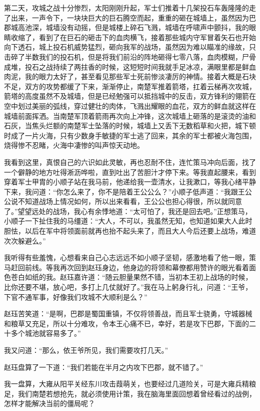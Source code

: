 第二天，攻城之战十分惨烈，太阳刚刚升起，军士们推着十几架投石车轰隆隆的走了出来，一声令下，一块块巨大的巨石腾空而起，重重的砸在城墙上，虽然因为巴郡城高池深，城墙没有动摇，但是城楼上碎石飞溅，城墙在呼啸声中颤抖，我的眼睛收缩了，看到了在巨石的砸击下的血肉横飞，接着那些城内守军冒着矢石也开始向下透石，城上投石机威势猛烈，砸向我军的战场，虽然因为难以瞄准的缘故，只击碎了半数我们的投石机，但是将我们前沿的阵地砸得七零八落，血肉模糊，尸骨成堆，投石之战持续了两拄香的时候，这短短时间我就手足冰凉，满眼里都是鲜血肉泥，我的眼力太好了，甚至看见那些军士死前惨淡凄厉的神情。接着大概是石块不足，双方的攻势都缓了下来，渐渐停止，南楚军推着箭塔，扛着云梯再次攻城，箭塔的高度虽然不及城墙，但是已经勉强可以抵挡城中的反击，双方锋利的翎箭在空中划过美丽的弧线，穿过健壮的肉体，飞溅出耀眼的血花，双方的鲜血就这样在城墙前面挥洒。当南楚军顶着箭雨再次向上冲锋，这次城墙上砸落的是滚烫的油和石灰，当焦头烂额的南楚军士坠落的时候，城墙上又丢下无数稻草和火把，城下顿时成了一片火海，只有少数身手敏捷的军士逃了回来，其余的军士都被火海包围，烧得惨不忍睹，火海中凄惨的叫声惊天动地。

我看到这里，真恨自己的六识如此灵敏，再也忍耐不住，连忙策马冲向后面，找了一个僻静的地方吐得淅沥哗啦，直到吐出了苦胆汁才停下来。等我直起腰来，看到穿着军士甲胄的小顺子站在我马前，他递给我一壶清水，让我漱口，等我心绪平静下来，我问道：“你怎么来了，你不是陪着王公公么？”小顺子低声道：“我跟王公公说不知道战场上情况如何，所以出来看看，王公公也担心得很，所以就同意了。”望望远处的战场，我心有余悸地道：“太可怕了，我还是回去吧。”正想策马，小顺子一下扯住我的马缰道：“大人，不可以，我虽然无知，也知道如果大人此时胆怯，以后在军中将领面前就再也抬不起头来了，而且大人今后还要上战场，难道次次躲避么。”

我听得有些羞愧，心想看来自己心志远远不如小顺子坚韧，感激地看了他一眼，策马赶回前线。等我再次回到赵珏身边，他身边的将领和幕僚都用赞许的眼光看着面色苍白如纸的我。赵珏嘉许道：“随云胆量果然不错，当初本王初上战场的时候，比你还要不堪，放心吧，多打上几仗就好了。”我在马上躬身行礼，问道：“王爷，下官不通军事，好像我们攻城不大顺利是么？”

赵珏苦笑道：“是啊，巴郡是蜀国重镇，不仅将领善战，而且军士骁勇，守城器械和粮草又充足，所以十分难攻，令本王心痛不已，幸好，若是攻下巴郡，下面的二十多个城池就容易多了。”

我又问道：“那么，依王爷所见，我们需要攻打几天。”

赵珏盘算了一下道：“我们若能在半月之内攻下巴郡，就不错了。”

我一盘算，大雍从阳平关经东川攻击葭萌关，也要经过几道险关，可是大雍兵精粮足，我们南楚若想抢先，就必须使用计策，我在脑海里面回想着曾经看过的战例，怎样才能解决当前的僵局呢？

